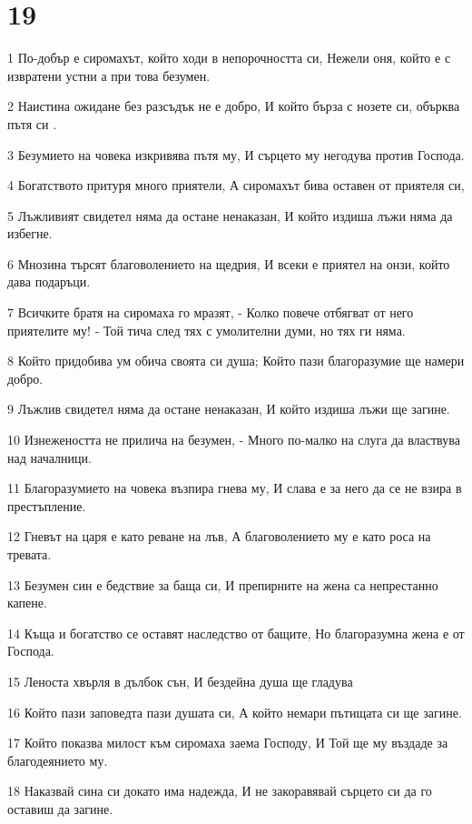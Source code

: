 \chapter{19}

\par 1 По-добър е сиромахът, който ходи в непорочността си, Нежели оня, който е с извратени устни а при това безумен.
\par 2 Наистина ожидане без разсъдък не е добро, И който бърза с нозете си, обърква пътя си .
\par 3 Безумието на човека изкривява пътя му, И сърцето му негодува против Господа.
\par 4 Богатството притуря много приятели, А сиромахът бива оставен от приятеля си,
\par 5 Лъжливият свидетел няма да остане ненаказан, И който издиша лъжи няма да избегне.
\par 6 Мнозина търсят благоволението на щедрия, И всеки е приятел на онзи, който дава подаръци.
\par 7 Всичките братя на сиромаха го мразят, - Колко повече отбягват от него приятелите му! - Той тича след тях с умолителни думи, но тях ги няма.
\par 8 Който придобива ум обича своята си душа; Който пази благоразумие ще намери добро.
\par 9 Лъжлив свидетел няма да остане ненаказан, И който издиша лъжи ще загине.
\par 10 Изнежеността не прилича на безумен, - Много по-малко на слуга да властвува над началници.
\par 11 Благоразумието на човека възпира гнева му, И слава е за него да се не взира в престъпление.
\par 12 Гневът на царя е като реване на лъв, А благоволението му е като роса на тревата.
\par 13 Безумен син е бедствие за баща си, И препирните на жена са непрестанно капене.
\par 14 Къща и богатство се оставят наследство от бащите, Но благоразумна жена е от Господа.
\par 15 Леноста хвърля в дълбок сън, И бездейна душа ще гладува
\par 16 Който пази заповедта пази душата си, А който немари пътищата си ще загине.
\par 17 Който показва милост към сиромаха заема Господу, И Той ще му въздаде за благодеянието му.
\par 18 Наказвай сина си докато има надежда, И не закоравявай сърцето си да го оставиш да загине.
